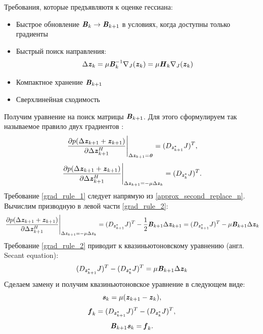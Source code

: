 Требования, которые предъявляютя к оценке гессиана:
\begin{itemize}
	\item Быстрое обновление $\textbf{\textit{B}}_{k}\rightarrow\textbf{\textit{B}}_{k+1}$ в условиях, когда доступны только градиенты
	\item Быстрый поиск направления:
	\begin{equation}
		\Delta\textbf{\textit{z}}_{k}=\mu\textbf{\textit{B}}_{k}^{-1}
		\nabla_{J}(\textbf{\textit{z}}_{k})=
		\mu\textbf{\textit{H}}_{k}
		\nabla_{J}(\textbf{\textit{z}}_{k})
	\end{equation}
	\item Компактное хранение $\textbf{\textit{B}}_{k+1}$
	\item Сверхлинейная сходимость
\end{itemize}
Получим уравнение на поиск матрицы $\textbf{\textit{B}}_{k+1}$. Для этого сформулируем так называемое правило двух градиентов \cite{fletcher}:
\begin{equation}
	\left.\frac{\partial p(\Delta\textbf{\textit{z}}_{k+1}+\textbf{\textit{z}}_{k+1})}{\partial \Delta\textbf{\textit{z}}_{k+1}^H}
	\right|_{\Delta\textbf{\textit{z}}_{k+1}=\textbf{\textit{0}}}=(D_{\textbf{\textit{z}}^*_{k+1}}{J})^T,
	\label{grad_rule_1}
\end{equation}
\begin{equation}
	\left.\frac{\partial p(\Delta\textbf{\textit{z}}_{k+1}+\textbf{\textit{z}}_{k+1})}{\partial \Delta\textbf{\textit{z}}_{k+1}^H}
	\right|_{\Delta\textbf{\textit{z}}_{k+1}=-\mu\Delta\textbf{\textit{z}}_{k}}=(D_{\textbf{\textit{z}}^*_{k}}{J})^T.
	\label{grad_rule_2}
\end{equation}
Требование \eqref{grad_rule_1} следует напрямую из \eqref{approx_second_replace_n}. Вычислим призводную в левой части \eqref{grad_rule_2}:
\begin{equation}
	\left.\frac{\partial p(\Delta\textbf{\textit{z}}_{k+1}+\textbf{\textit{z}}_{k+1})}{\partial \Delta\textbf{\textit{z}}_{k+1}^H}
	\right|_{\Delta\textbf{\textit{z}}_{k+1}=-\mu\Delta\textbf{\textit{z}}_{k}}=
	(D_{\textbf{\textit{z}}^*_{k+1}}J)^T-\frac{1}{2}\textbf{\textit{B}}_{k+1}\Delta\textbf{\textit{z}}_{k+1}=
	(D_{\textbf{\textit{z}}^*_{k+1}}J)^T-\mu\textbf{\textit{B}}_{k+1}\Delta\textbf{\textit{z}}_{k}	
\end{equation}
Требование \eqref{grad_rule_2} приводит к квазиньютоновскому уравнению (англ. Secant equation):
\begin{equation}
	(D_{\textbf{\textit{z}}^*_{k+1}}J)^T-(D_{\textbf{\textit{z}}^*_{k}}J)^T=
	\mu\textbf{\textit{B}}_{k+1}\Delta\textbf{\textit{z}}_{k}	
\end{equation}
Сделаем замену и получим квазиньютоновское уравнение в следующем виде:
\begin{equation}
	\textbf{\textit{s}}_{k}=\mu(\textbf{\textit{z}}_{k+1}-\textbf{\textit{z}}_{k}),
	\label{kvazi_newton_s}
\end{equation}
\begin{equation}
	\textbf{\textit{f}}_{k}=(D_{\textbf{\textit{z}}^*_{k+1}}J)^T-(D_{\textbf{\textit{z}}^*_{k}}J)^T,
	\label{kvazi_newton_f}
\end{equation}
\begin{equation}
	\textbf{\textit{B}}_{k+1}\textbf{\textit{s}}_{k}=\textbf{\textit{f}}_{k}.
	\label{kvazi_newton_secant_eq}
\end{equation}

